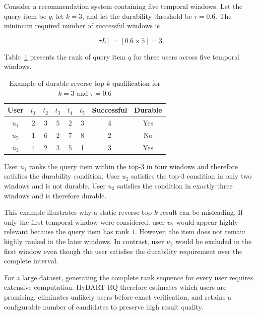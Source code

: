 Consider a recommendation system containing five temporal windows. Let the query item be $q$, let $k=3$, and let the durability threshold be $\tau=0.6$. The minimum required number of successful windows is

\begin{equation}
\left\lceil\tau L\right\rceil
=
\left\lceil0.6\times5\right\rceil
=
3.
\label{eq:motivating_required_windows}
\end{equation}

Table~\ref{tab:motivating_example} presents the rank of query item $q$ for three users across five temporal windows.

\begin{table}[htbp]
\centering
\caption{Example of durable reverse top-$k$ qualification for $k=3$ and $\tau=0.6$}
\label{tab:motivating_example}
\small
\renewcommand{\arraystretch}{1.25}
\setlength{\tabcolsep}{5pt}
\begin{tabular}{|c|c|c|c|c|c|c|c|}
\hline
\textbf{User} &
\textbf{$t_1$} &
\textbf{$t_2$} &
\textbf{$t_3$} &
\textbf{$t_4$} &
\textbf{$t_5$} &
\textbf{Successful} &
\textbf{Durable} \\
\hline
$u_1$ & 2 & 3 & 5 & 2 & 3 & 4 & Yes \\
\hline
$u_2$ & 1 & 6 & 2 & 7 & 8 & 2 & No \\
\hline
$u_3$ & 4 & 2 & 3 & 5 & 1 & 3 & Yes \\
\hline
\end{tabular}
\end{table}

User $u_1$ ranks the query item within the top-$3$ in four windows and therefore satisfies the durability condition. User $u_2$ satisfies the top-$3$ condition in only two windows and is not durable. User $u_3$ satisfies the condition in exactly three windows and is therefore durable.

This example illustrates why a static reverse top-$k$ result can be misleading. If only the first temporal window were considered, user $u_2$ would appear highly relevant because the query item has rank $1$. However, the item does not remain highly ranked in the later windows. In contrast, user $u_3$ would be excluded in the first window even though the user satisfies the durability requirement over the complete interval.

For a large dataset, generating the complete rank sequence for every user requires extensive computation. HyDART-RQ therefore estimates which users are promising, eliminates unlikely users before exact verification, and retains a configurable number of candidates to preserve high result quality.

